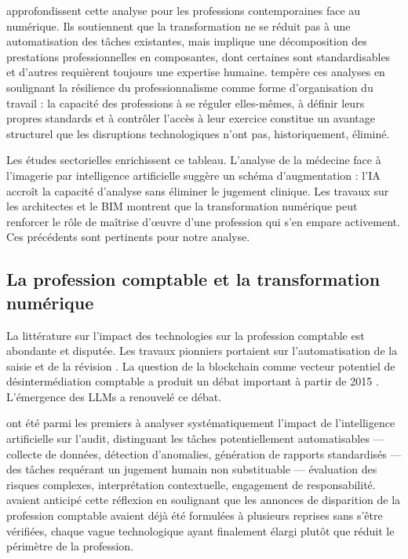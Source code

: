\documentclass[12pt,a4paper]{article}
\begin{document}
\textcite{susskind2015} approfondissent cette analyse pour les professions contemporaines face au numérique. Ils soutiennent que la transformation ne se réduit pas à une automatisation des tâches existantes, mais implique une décomposition des prestations professionnelles en composantes, dont certaines sont standardisables et d'autres requièrent toujours une expertise humaine. \textcite{freidson2001} tempère ces analyses en soulignant la résilience du professionnalisme comme forme d'organisation du travail : la capacité des professions à se réguler elles-mêmes, à définir leurs propres standards et à contrôler l'accès à leur exercice constitue un avantage structurel que les disruptions technologiques n'ont pas, historiquement, éliminé.

Les études sectorielles enrichissent ce tableau. L'analyse de la médecine face à l'imagerie par intelligence artificielle \parencite{topol2019} suggère un schéma d'augmentation : l'IA accroît la capacité d'analyse sans éliminer le jugement clinique. Les travaux sur les architectes et le BIM \parencite{eastman2011} montrent que la transformation numérique peut renforcer le rôle de maîtrise d'œuvre d'une profession qui s'en empare activement. Ces précédents sont pertinents pour notre analyse.

\subsection{La profession comptable et la transformation numérique}

La littérature sur l'impact des technologies sur la profession comptable est abondante et disputée. Les travaux pionniers portaient sur l'automatisation de la saisie et de la révision \parencite{kaplan2011}. La question de la blockchain comme vecteur potentiel de désintermédiation comptable a produit un débat important à partir de 2015 \parencite{dai2017}. L'émergence des LLMs a renouvelé ce débat.

\textcite{kokina2017} ont été parmi les premiers à analyser systématiquement l'impact de l'intelligence artificielle sur l'audit, distinguant les tâches potentiellement automatisables — collecte de données, détection d'anomalies, génération de rapports standardisés — des tâches requérant un jugement humain non substituable — évaluation des risques complexes, interprétation contextuelle, engagement de responsabilité. \textcite{sutton2016} avaient anticipé cette réflexion en soulignant que les annonces de disparition de la profession comptable avaient déjà été formulées à plusieurs reprises sans s'être vérifiées, chaque vague technologique ayant finalement élargi plutôt que réduit le périmètre de la profession.
\end{document}

